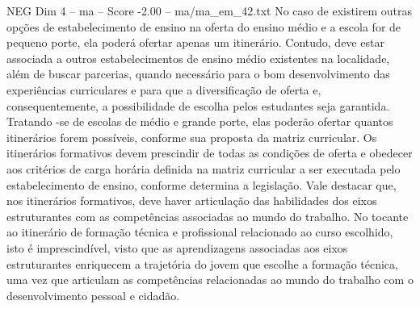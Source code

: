 \begin{textsample}{NEG Dim 4 – ma – Score -2.00 – ma/ma\_em\_42.txt}
No caso de existirem outras opções de estabelecimento de ensino na oferta do ensino médio e a escola for de pequeno porte, ela poderá ofertar apenas um itinerário.
Contudo, deve estar associada a outros estabelecimentos de ensino médio existentes na localidade, além de buscar parcerias, quando necessário para o bom desenvolvimento das experiências curriculares e para que a diversificação de oferta e, consequentemente, a possibilidade de escolha pelos estudantes seja garantida.
Tratando -se de escolas de médio e grande porte, elas poderão ofertar quantos itinerários forem possíveis, conforme sua proposta da matriz curricular.
Os itinerários formativos devem prescindir de todas as condições de oferta e obedecer aos critérios de carga horária definida na matriz curricular a ser executada pelo estabelecimento de ensino, conforme determina a legislação.
Vale destacar que, nos itinerários formativos, deve haver articulação das habilidades dos eixos estruturantes com as competências associadas ao mundo do trabalho.
No tocante ao itinerário de formação técnica e profissional relacionado ao curso escolhido, isto é imprescindível, visto que as aprendizagens associadas aos eixos estruturantes enriquecem a trajetória do jovem que escolhe a formação técnica, uma vez que articulam as competências relacionadas ao mundo do trabalho com o desenvolvimento pessoal e cidadão.

\end{textsample}
